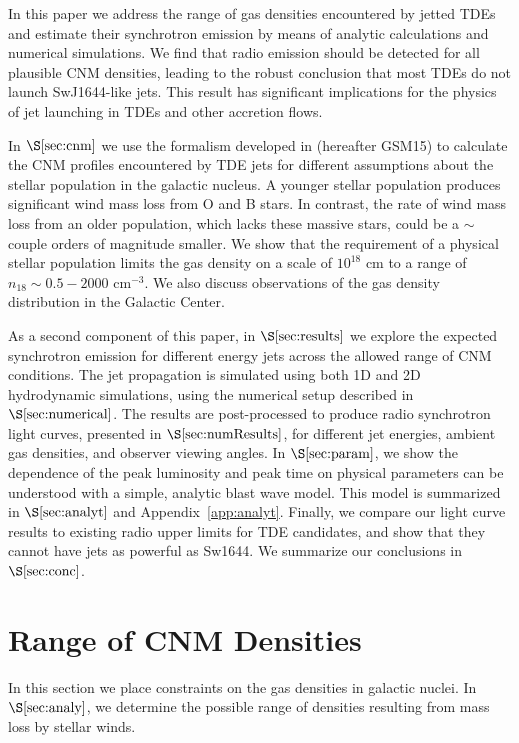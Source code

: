 \documentclass[usenatbib,fleqn]{mnras}
\begin{document}
In this paper we address the range of gas densities encountered by
jetted TDEs and estimate their synchrotron emission by means of
analytic calculations and numerical simulations.  We find that radio
emission should be detected for all plausible CNM densities, leading
to the robust conclusion that most TDEs do not launch SwJ1644-like
jets.  This result has significant implications for the physics of jet
launching in TDEs and other accretion flows.

In $\S\ref{sec:cnm}$ we use the formalism developed in
\citet{Generozov+2015} (hereafter GSM15) to calculate the CNM profiles
encountered by TDE jets for different assumptions about the stellar
population in the galactic nucleus.  A younger stellar population
produces significant wind mass loss from O and B stars. In contrast,
the rate of wind mass loss from an older population, which lacks these
massive stars, could be a $\sim$couple orders of magnitude smaller.
We show that the requirement of a physical stellar population limits
the gas density on a scale of $10^{18}$ cm to a range of $n_{18} \sim
0.5-2000$ cm$^{-3}$. We also discuss observations of the gas density
distribution in the Galactic Center. 

As a second component of this paper, in $\S\ref{sec:results}$ we
explore the expected synchrotron emission for different energy jets
across the allowed range of CNM conditions.  The jet propagation is
simulated using both 1D and 2D hydrodynamic simulations, using the
numerical setup described in $\S\ref{sec:numerical}$. The results are
post-processed to produce radio synchrotron light curves, presented in
$\S\ref{sec:numResults}$, for different jet energies, ambient gas
densities, and observer viewing angles. In $\S\ref{sec:param}$, we
show the dependence of the peak luminosity and peak time on physical
parameters can be understood with a simple, analytic blast wave
model. This model is summarized in $\S\ref{sec:analyt}$ and
Appendix~\ref{app:analyt}. Finally, we compare our light curve results
to existing radio upper limits for TDE candidates, and show that they
cannot have jets as powerful as Sw1644. We summarize our conclusions
in $\S\ref{sec:conc}$.

\section{Range of CNM Densities}
\label{sec:cnm}

In this section we place constraints on the gas densities in galactic
nuclei.  In $\S\ref{sec:analy}$, we determine the possible range of
densities resulting from mass loss by stellar winds. 
\end{document}
